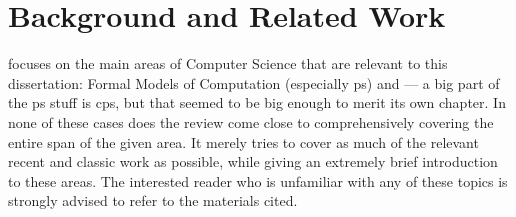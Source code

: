 \chapter{\label{chap:lr}Background and Related Work}
 focuses on the main areas of Computer Science that are relevant to this dissertation:  Formal Models of Computation (especially \gls{ps}) and  --- a big part of the \gls{ps} stuff is \gls{cps}, but that seemed to be big enough to merit its own chapter.  In none of these cases does the review come close to comprehensively covering the entire span of the given area.  It merely tries to cover as much of the relevant recent and classic work as possible, while giving an extremely brief introduction to these areas.  The interested reader who is unfamiliar with any of these topics is strongly advised to refer to the materials cited.





% 